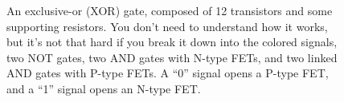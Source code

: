 \begin{figure}[h!]
\begin{center}

\caption{An exclusive-or (XOR) gate, composed of 12 transistors and some supporting resistors. You don't need to understand how it works, but it's not that hard if you break it down into the colored signals, two NOT gates, two AND gates with N-type FETs, and two linked AND gates with P-type FETs. A ``0'' signal opens a P-type FET, and a ``1'' signal opens an N-type FET.}
\label{fig:xorgate}
\end{center}
\end{figure}

\clearpage

